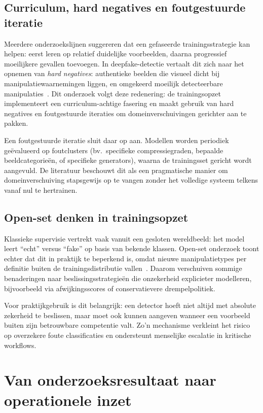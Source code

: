 \subsection{Curriculum, hard negatives en foutgestuurde iteratie}
Meerdere onderzoekslijnen suggereren dat een gefaseerde trainingsstrategie kan helpen: eerst leren op relatief duidelijke voorbeelden, daarna progressief moeilijkere gevallen toevoegen. In deepfake-detectie vertaalt dit zich naar het opnemen van \emph{hard negatives}: authentieke beelden die visueel dicht bij manipulatiewaarnemingen liggen, en omgekeerd moeilijk detecteerbare manipulaties~\autocite{OpenSet2025,EvaluationModels2025}. Dit onderzoek volgt deze redenering: de trainingsopzet implementeert een curriculum-achtige fasering en maakt gebruik van hard negatives en foutgestuurde iteraties om domeinverschuivingen gerichter aan te pakken.

Een foutgestuurde iteratie sluit daar op aan. Modellen worden periodiek geëvalueerd op foutclusters (bv.~specifieke compressiegraden, bepaalde beeldcategorieën, of specifieke generators), waarna de trainingsset gericht wordt aangevuld. De literatuur beschouwt dit als een pragmatische manier om domeinverschuiving stapsgewijs op te vangen zonder het volledige systeem telkens vanaf nul te hertrainen.

\subsection{Open-set denken in trainingsopzet}
Klassieke supervisie vertrekt vaak vanuit een gesloten wereldbeeld: het model leert ``echt'' versus ``fake'' op basis van bekende klassen. Open-set onderzoek toont echter dat dit in praktijk te beperkend is, omdat nieuwe manipulatietypes per definitie buiten de trainingsdistributie vallen~\autocite{OpenSet2025}. Daarom verschuiven sommige benaderingen naar beslissingsstrategieën die onzekerheid explicieter modelleren, bijvoorbeeld via afwijkingsscores of conservatievere drempelpolitiek.

Voor praktijkgebruik is dit belangrijk: een detector hoeft niet altijd met absolute zekerheid te beslissen, maar moet ook kunnen aangeven wanneer een voorbeeld buiten zijn betrouwbare competentie valt. Zo'n mechanisme verkleint het risico op overzekere foute classificaties en ondersteunt menselijke escalatie in kritische workflows.

\section{Van onderzoeksresultaat naar operationele inzet}

